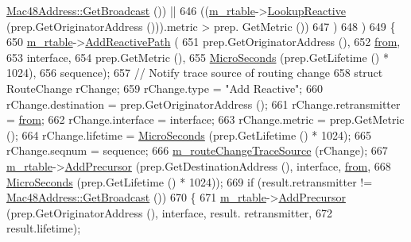 \begin{DoxyCode}
      \hyperlink{classns3_1_1Mac48Address_a55156e302c6bf950c0b558365adbde84}{Mac48Address::GetBroadcast} ()) ||
646       ((\hyperlink{classns3_1_1dot11s_1_1HwmpProtocol_a12fda0e3e5a400888c8ba1a87c1a7216}{m\_rtable}->\hyperlink{classns3_1_1dot11s_1_1HwmpRtable_a41a44ed94c1ed4d798f3278ba8db0f1f}{LookupReactive} (prep.GetOriginatorAddress ())).metric > prep.
      GetMetric ())
647     )
648     )
649     \{
650       \hyperlink{classns3_1_1dot11s_1_1HwmpProtocol_a12fda0e3e5a400888c8ba1a87c1a7216}{m\_rtable}->\hyperlink{classns3_1_1dot11s_1_1HwmpRtable_af764d62637a7c567706f4fa0cc09c51d}{AddReactivePath} (
651         prep.GetOriginatorAddress (),
652         \hyperlink{lte__amc_8m_a1b4c81ff74eb1a626b5ade44c81004b3}{from},
653         interface,
654         prep.GetMetric (),
655         \hyperlink{group__timecivil_ga17465a639c8d1464e76538afdd78a9f0}{MicroSeconds} (prep.GetLifetime () * 1024),
656         sequence);
657       \textcolor{comment}{// Notify trace source of routing change}
658       \textcolor{keyword}{struct }RouteChange rChange;
659       rChange.type = \textcolor{stringliteral}{"Add Reactive"};
660       rChange.destination = prep.GetOriginatorAddress ();
661       rChange.retransmitter = \hyperlink{lte__amc_8m_a1b4c81ff74eb1a626b5ade44c81004b3}{from};
662       rChange.interface = interface;
663       rChange.metric = prep.GetMetric ();
664       rChange.lifetime = \hyperlink{group__timecivil_ga17465a639c8d1464e76538afdd78a9f0}{MicroSeconds} (prep.GetLifetime () * 1024);
665       rChange.seqnum = sequence;
666       \hyperlink{classns3_1_1dot11s_1_1HwmpProtocol_aff5ca87b57430809a6b6ee25fa526948}{m\_routeChangeTraceSource} (rChange);
667       \hyperlink{classns3_1_1dot11s_1_1HwmpProtocol_a12fda0e3e5a400888c8ba1a87c1a7216}{m\_rtable}->\hyperlink{classns3_1_1dot11s_1_1HwmpRtable_ad867ab6ba437c2151907025750bf818b}{AddPrecursor} (prep.GetDestinationAddress (), interface, 
      \hyperlink{lte__amc_8m_a1b4c81ff74eb1a626b5ade44c81004b3}{from},
668                               \hyperlink{group__timecivil_ga17465a639c8d1464e76538afdd78a9f0}{MicroSeconds} (prep.GetLifetime () * 1024));
669       \textcolor{keywordflow}{if} (result.retransmitter != \hyperlink{classns3_1_1Mac48Address_a55156e302c6bf950c0b558365adbde84}{Mac48Address::GetBroadcast} ())
670         \{
671           \hyperlink{classns3_1_1dot11s_1_1HwmpProtocol_a12fda0e3e5a400888c8ba1a87c1a7216}{m\_rtable}->\hyperlink{classns3_1_1dot11s_1_1HwmpRtable_ad867ab6ba437c2151907025750bf818b}{AddPrecursor} (prep.GetOriginatorAddress (), interface, result.
      retransmitter,
672                                   result.lifetime);

\end{DoxyCode}
